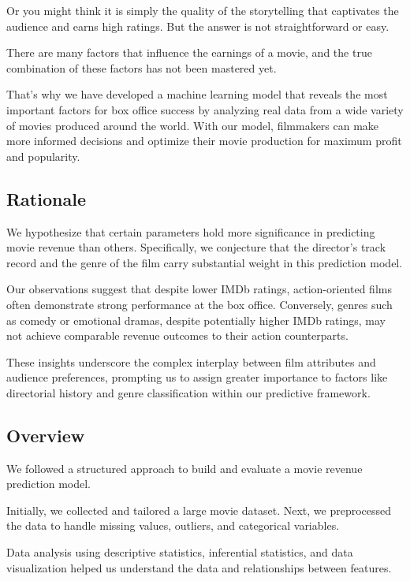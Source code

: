 \documentclass[conference]{IEEEtran}
\begin{document}
        Or you might think it is simply the quality of the storytelling that captivates the audience and earns high ratings.
        But the answer is not straightforward or easy.
        
        There are many factors that influence the earnings of a movie, and the true combination of these factors has not been mastered yet.
        
        That’s why we have developed a machine learning model that reveals the most important factors for box office success by analyzing real data from a wide variety of movies produced around the world.
        With our model, filmmakers can make more informed decisions and optimize their movie production for maximum profit and popularity.

    \subsection{Rationale}
        We hypothesize that certain parameters hold more significance in predicting movie revenue than others. Specifically, we conjecture that the director's track record and the genre of the film carry substantial weight in this prediction model.
        
        Our observations suggest that despite lower IMDb ratings, action-oriented films often demonstrate strong performance at the box office. Conversely, genres such as comedy or emotional dramas, despite potentially higher IMDb ratings, may not achieve comparable revenue outcomes to their action counterparts. 
        
        These insights underscore the complex interplay between film attributes and audience preferences, prompting us to assign greater importance to factors like directorial history and genre classification within our predictive framework.

    \subsection{Overview}
        
    We followed a structured approach to build and evaluate a movie revenue prediction model.
    
    Initially, we collected and tailored a large movie dataset. Next, we preprocessed the data to handle missing values, outliers, and categorical variables.
    
    Data analysis using descriptive statistics, inferential statistics, and data visualization helped us understand the data and relationships between features.
    
\end{document}
